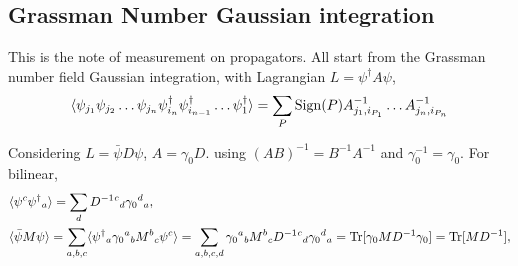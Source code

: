 \subsection{\label{GrassmanNumberGaussianIntegerate}Grassman Number Gaussian integration}

This is the note of measurement on propagators.
All start from the Grassman number field Gaussian integration, with Lagrangian $L=\psi^{\dagger} A \psi$,
\begin{equation}
\begin{split}
&\langle \psi_{j_1}\psi_{j_2}\ldots \psi_{j_n}\psi^{\dagger}_{i_n}\psi^{\dagger}_{i_{n-1}}\ldots \psi^{\dagger}_1  \rangle = \sum _P {\rm Sign}(P)A^{-1}_{j_1,i_{P_1}}\ldots A^{-1}_{j_n,i_{P_n}}\\
\end{split}
\end{equation}

Considering $L=\bar{\psi} D \psi$, $A=\gamma _0 D$. using $(AB)^{-1}=B^{-1}A^{-1}$ and $\gamma _0^{-1}=\gamma _0$.
For bilinear,
\begin{equation}
\begin{split}
&\langle \psi {}^c\psi^{\dagger}{}_a\rangle = \sum _d {D^{-1}} {}^c{}_d \gamma _{0}{}^d{}_a ,\\
&\langle \bar{\psi} M \psi\rangle = \sum _{a,b,c} \langle \psi^{\dagger}{} _a \gamma _{0}{}^a{}_b M{}^b{}_c \psi {}^c\rangle = \sum _{a,b,c,d}  \gamma _{0}{}^a{}_b M{}^b{}_c {D^{-1}} {}^c{}_d \gamma _{0}{}^d{}_a = {\rm Tr}[\gamma _0 M D^{-1}\gamma _0]={\rm Tr}[M D^{-1}],\\
\end{split}
\end{equation}

